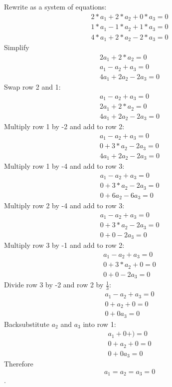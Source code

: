 \begin{Answer}[ref=vector_independence]
    Rewrite as a system of equations:
        $$\begin{matrix}
			2*a_1 +2*a_2 + 0*a_3 = 0 \\
			1*a_1 - 1*a_2 +1*a_3 = 0 \\
			4*a_1 + 2*a_2 - 2*a_3 = 0
		  \end{matrix} $$
	Simplify
		$$\begin{matrix}
			2a_1 +2*a_2  = 0 \\
			a_1 - a_2 + a_3 = 0 \\
			4a_1 + 2a_2 - 2a_3 = 0
		  \end{matrix} $$
	Swap row 2 and 1:
		$$\begin{matrix}
			a_1 - a_2 + a_3 = 0 \\
			2a_1 +2*a_2  = 0 \\
			4a_1 + 2a_2 - 2a_3 = 0
		  \end{matrix} $$
	Multiply row 1 by -2 and add to row 2:
	   $$\begin{matrix}
			a_1 - a_2 + a_3 = 0 \\
			0 +  3*a_2 -2a_3    = 0 \\
			4a_1 + 2a_2 - 2a_3 = 0
		  \end{matrix} $$
	Multiply row 1 by -4 and add to row 3:	
	    $$\begin{matrix}
			a_1 - a_2 + a_3 = 0 \\
			0 +   3*a_2 -2a_3    = 0 \\
			0   + 6a_2 - 6a_3 = 0
		  \end{matrix} $$
	Multiply row 2 by -4 and add to row 3:
	   $$\begin{matrix}
			a_1 - a_2 + a_3 = 0 \\
			0 +   3*a_2 -2a_3    = 0 \\
			0   + 0   - 2a_3 = 0
		  \end{matrix} $$
	Multiply row 3 by -1 and add to row 2:
		$$\begin{matrix}
			a_1 - a_2 + a_3 = 0 \\
			0 +   3*a_2 +0    = 0 \\
			0   + 0   - 2a_3 = 0
		\end{matrix} $$
    Divide row 3 by -2 and row 2 by $\frac{1}{3}$:
    	$$\begin{matrix}
			a_1 - a_2 + a_3 = 0 \\
			0 +   a_2 +0    = 0 \\
			0   + 0   a_3 = 0
		\end{matrix} $$
	Backsubstitute $a_2$ and $a_3$ into row 1:
	 	$$\begin{matrix}
			a_1 +0 + ) = 0 \\
			0 +   a_2 +0   = 0 \\
			0   + 0   a_3 = 0
		\end{matrix} $$
	 Therefore $$a_1 = a_2 = a_3 = 0$$.
\end{Answer}
    
